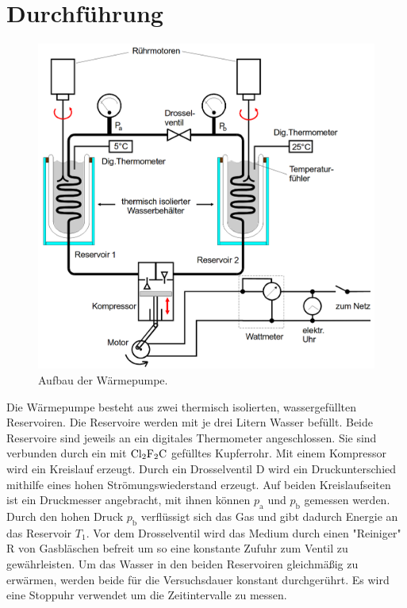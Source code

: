 \section{Durchführung}
\label{sec:Durchführung}

\begin{figure}[H]\label{fig:waermepumpe}
    \centering
    \includegraphics[width=1\textwidth]{content/Aufbau_Waermepumpe.png}
    \caption{Aufbau der Wärmepumpe.\protect\footnotemark}
\end{figure}

Die Wärmepumpe besteht aus zwei thermisch isolierten, wassergefüllten Reservoiren. Die Reservoire werden mit je drei Litern Wasser befüllt. Beide Reservoire sind jeweils an ein digitales
Thermometer angeschlossen. Sie sind verbunden durch ein mit $\ce{Cl2F2C}$ gefülltes Kupferrohr. Mit einem Kompressor wird 
ein Kreislauf erzeugt. Durch ein Drosselventil D wird ein Druckunterschied mithilfe eines hohen Strömungswiederstand erzeugt. Auf beiden 
Kreislaufseiten ist ein Druckmesser angebracht, mit ihnen können $p_{\text{a}}$ und $p_{\text{b}}$ gemessen werden. Durch den hohen Druck $p_{\text{b}}$
verflüssigt sich das Gas und gibt dadurch Energie an das Reservoir $T_1$. Vor dem Drosselventil wird das Medium durch einen
"Reiniger"  R von Gasbläschen befreit um so eine konstante Zufuhr zum Ventil zu gewährleisten. Um das Wasser in den beiden Reservoiren
gleichmäßig zu erwärmen, werden beide für die Versuchsdauer konstant durchgerührt. Es wird eine Stoppuhr verwendet um die Zeitintervalle zu messen.\\

